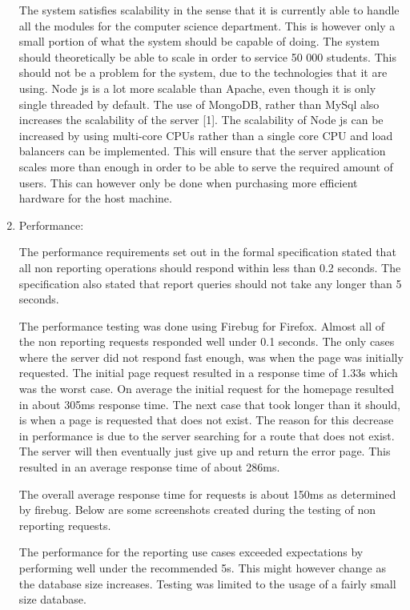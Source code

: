 \documentclass[hidelinks, 12pt, oneside]{article}
\begin{document}
\begin{enumerate}
The system satisfies scalability in the sense that it is currently able to handle all the modules for the computer science department. This is however only a small portion of what the system should be capable of doing. The system should theoretically be able to scale in order to service 50 000 students. This should not be a problem for the system, due to the technologies that it are using. Node js is a lot more scalable than Apache, even though it is only single threaded by default. The use of MongoDB, rather than MySql also increases the scalability of the server [1].  The scalability of Node js can be increased by using multi-core CPUs rather than a single core CPU and load balancers can be implemented. This will ensure that the server application scales more than enough in order to be able to serve the required amount of users. This can however only be done when purchasing more efficient hardware for the host machine. 

\item Performance:

The performance requirements set out in the formal specification stated that all non reporting operations should respond within less than 0.2 seconds. The specification also stated that report queries should not take any longer than 5 seconds.

The performance testing was done using Firebug for Firefox. Almost all of the non reporting requests responded well under 0.1 seconds. The only cases where the server did not respond fast enough, was when the page was initially requested. The initial page request resulted in a response time of 1.33s which was the worst case. On average the initial request for the homepage resulted in about 305ms response time. 
The next case that took longer than it should, is when a page is requested that does not exist. The reason for this decrease in performance is due to the server searching for a route that does not exist. The server will then eventually just give up and return the error page. This resulted in an average response time of about 286ms. 

The overall average response time for requests is about 150ms as determined by firebug. Below are some screenshots created during the testing of non reporting requests.

The performance for the reporting use cases exceeded expectations by performing well under the recommended 5s. This might however change as the database size increases. Testing was limited to the usage of a fairly small size database. 


\end{enumerate}
\end{document}
